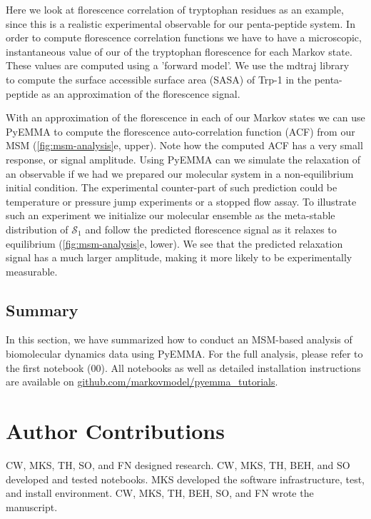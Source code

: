 \documentclass[9pt,tutorial]{livecoms}
\newcommand{\githubrepository}{\url{github.com/markovmodel/pyemma_tutorials}}
\begin{document}
Here we look at florescence correlation of tryptophan residues as an example, since this is a realistic experimental observable for our penta-peptide system. In order to compute florescence correlation functions we have to have a microscopic, instantaneous value of our of the tryptophan florescence for each Markov state. These values are computed using a 'forward model'. We use the mdtraj library~\cite{mdtraj} to compute the surface accessible surface area (SASA) of Trp-1 in the penta-peptide as an approximation of the florescence signal. 

With an approximation of the florescence in each of our Markov states we can use PyEMMA to compute the florescence auto-correlation function (ACF) from our MSM (\ref{fig:msm-analysis}e, upper). Note how the computed ACF has a very small response, or signal amplitude. Using PyEMMA can we simulate the relaxation of an observable if we had we prepared our molecular system in a non-equilibrium initial condition. The experimental counter-part of such prediction could be temperature or pressure jump experiments or a stopped flow assay. To illustrate such an experiment we initialize our molecular ensemble as the meta-stable distribution of $\mathcal{S}_1$ and follow the predicted florescence signal as it relaxes to equilibrium (\ref{fig:msm-analysis}e, lower). We see that the predicted relaxation signal has a much larger amplitude, making it more likely to be experimentally measurable.

\subsection{Summary}

In this section, we have summarized how to conduct an MSM-based analysis of biomolecular dynamics data using PyEMMA. For the full analysis, please refer to the first notebook (00). All notebooks as well as detailed installation instructions are available on \githubrepository{}.

\section{Author Contributions}
%
CW, MKS, TH, SO, and FN designed research.
CW, MKS, TH, BEH, and SO developed and tested notebooks.
MKS developed the software infrastructure, test, and install environment.
CW, MKS, TH, BEH, SO, and FN wrote the manuscript.
\end{document}
